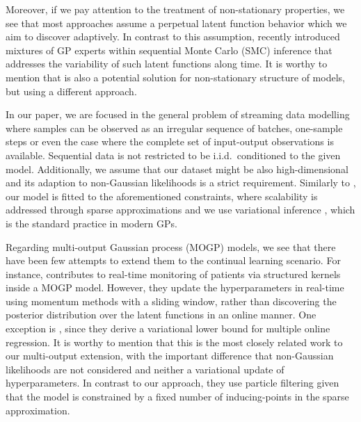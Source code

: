 \documentclass[]{article}
\begin{document}
Moreover, if we pay attention to the treatment of non-stationary properties, we see that most approaches assume a perpetual latent function behavior which we aim to discover adaptively. In contrast to this assumption, \citet{zhang2019sequential} recently introduced mixtures of GP experts \citep{rasmussen2002infinite} within sequential Monte Carlo (SMC) inference that addresses the variability of such latent functions along time. It is worthy to mention that \citet{solin2018infinite} is also a potential solution for non-stationary structure of models, but using a different approach.




















In our paper, we are focused in the general problem of streaming data modelling where samples can be observed as an irregular sequence of batches, one-sample steps or even the case where the complete set of input-output observations is available. Sequential data is not restricted to be i.i.d.\ conditioned to the given model. Additionally, we assume that our dataset might be also high-dimensional and its adaption to non-Gaussian likelihoods is a strict requirement. Similarly to \citet{bui2017streaming}, our model is fitted to the aforementioned constraints, where scalability is addressed through sparse approximations and we use variational inference \citep{titsias2009variational}, which is the standard practice in modern GPs.

Regarding multi-output Gaussian process (MOGP) models, we see that there have been few attempts to extend them to the continual learning scenario. For instance, \citet{cheng2017sparse} contributes to real-time monitoring of patients via structured kernels inside a MOGP model. However, they update the hyperparameters in real-time using momentum methods with a sliding window, rather than discovering the posterior distribution over the latent functions in an online manner. One exception is \citet{yang2018online}, since they derive a variational lower bound for multiple online regression. It is worthy to mention that this is the most closely related work to our multi-output extension, with the important difference that non-Gaussian likelihoods are not considered and neither a variational update of hyperparameters. In contrast to our approach, they use particle filtering given that the model is constrained by a fixed number of inducing-points in the sparse approximation.
\end{document}
